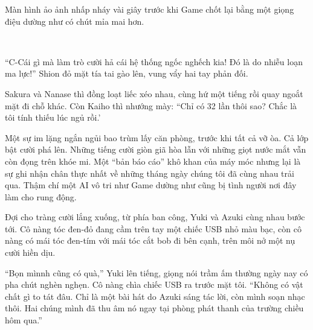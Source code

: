 \documentclass[../main.tex]{subfiles}
\begin{document}
\\
\\
\\
\\
\\

Màn hình ảo ảnh nhấp nháy vài giây trước khi Game chốt lại bằng một giọng điệu dường như có chút mỉa mai hơn.

\\

``C-Cái gì mà làm trò cười hả cái hệ thống ngốc nghếch kia! Đó là do nhiễu loạn ma lực!'' Shion đỏ mặt tía tai gào lên, vung vẩy hai tay phản đối.

Sakura và Nanase thì đồng loạt liếc xéo nhau, cùng hứ một tiếng rồi quay ngoắt mặt đi chỗ khác. Còn Kaiho thì nhướng mày: ``Chỉ có 32 lần thôi sao? Chắc là tôi tính thiếu lúc ngủ rồi.'


Một sự im lặng ngắn ngủi bao trùm lấy căn phòng, trước khi tất cả vỡ òa. Cả lớp bật cười phá lên. Những tiếng cười giòn giã hòa lẫn với những giọt nước mắt vẫn còn đọng trên khóe mi. Một ``bản báo cáo'' khô khan của máy móc nhưng lại là sự ghi nhận chân thực nhất về những tháng ngày chúng tôi đã cùng nhau trải qua. Thậm chí một AI vô tri như Game dường như cũng bị tình người nơi đây làm cho rung động.

Đợi cho tràng cười lắng xuống, từ phía ban công, Yuki và Azuki cùng nhau bước tới. Cô nàng tóc đen-đỏ đang cầm trên tay một chiếc USB nhỏ màu bạc, còn cô nàng có mái tóc đen-tím với mái tóc cắt bob đi bên cạnh, trên môi nở một nụ cười hiền dịu.

``Bọn mìnnh cũng có quà,'' Yuki lên tiếng, giọng nói trầm ấm thường ngày nay có pha chút nghèn nghẹn. Cô nàng chìa chiếc USB ra trước mặt tôi. ``Không có vật chất gì to tát đâu. Chỉ là một bài hát do Azuki sáng tác lời, còn mình soạn nhạc thôi. Hai chúng mình đã thu âm nó ngay tại phòng phát thanh của trường chiều hôm qua.''
\end{document}
